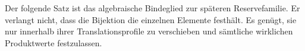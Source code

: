 \documentclass[main.tex]{subfiles}
\begin{document}
\begin{tabproofwide}
\end{tabproofwide}

Der folgende Satz ist das algebraische Bindeglied zur späteren
Reservefamilie.  Er verlangt nicht, dass die Bijektion die einzelnen
Elemente festhält.  Es genügt, sie nur innerhalb ihrer Translationsprofile
zu verschieben und sämtliche wirklichen Produktwerte festzulassen.
\end{document}

